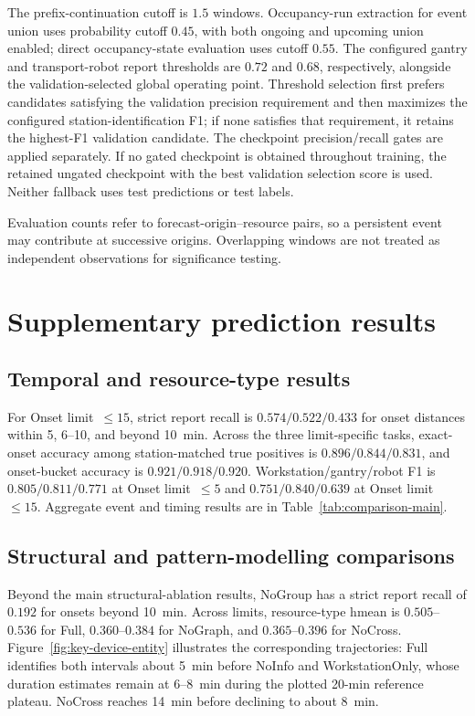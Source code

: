 The prefix-continuation cutoff is $1.5$ windows. Occupancy-run extraction for event union uses probability cutoff $0.45$, with both ongoing and upcoming union enabled; direct occupancy-state evaluation uses cutoff $0.55$. The configured gantry and transport-robot report thresholds are $0.72$ and $0.68$, respectively, alongside the validation-selected global operating point. Threshold selection first prefers candidates satisfying the validation precision requirement and then maximizes the configured station-identification F1; if none satisfies that requirement, it retains the highest-F1 validation candidate. The checkpoint precision/recall gates are applied separately. If no gated checkpoint is obtained throughout training, the retained ungated checkpoint with the best validation selection score is used. Neither fallback uses test predictions or test labels.

Evaluation counts refer to forecast-origin--resource pairs, so a persistent event may contribute at successive origins. Overlapping windows are not treated as independent observations for significance testing.

\FloatBarrier
\section{Supplementary prediction results}\label{app:supplementary-results}

\subsection{Temporal and resource-type results}

For Onset limit~$\leq15$, strict report recall is $0.574/0.522/0.433$ for onset distances within 5, 6--10, and beyond 10~min. Across the three limit-specific tasks, exact-onset accuracy among station-matched true positives is $0.896/0.844/0.831$, and onset-bucket accuracy is $0.921/0.918/0.920$. Workstation/gantry/robot F1 is $0.805/0.811/0.771$ at Onset limit~$\leq5$ and $0.751/0.840/0.639$ at Onset limit~$\leq15$. Aggregate event and timing results are in Table~\ref{tab:comparison-main}.

\subsection{Structural and pattern-modelling comparisons}

Beyond the main structural-ablation results, NoGroup has a strict report recall of $0.192$ for onsets beyond 10~min. Across limits, resource-type hmean is $0.505$--$0.536$ for Full, $0.360$--$0.384$ for NoGraph, and $0.365$--$0.396$ for NoCross. Figure~\ref{fig:key-device-entity} illustrates the corresponding trajectories: Full identifies both intervals about 5~min before NoInfo and WorkstationOnly, whose duration estimates remain at 6--8~min during the plotted 20-min reference plateau. NoCross reaches 14~min before declining to about 8~min.

